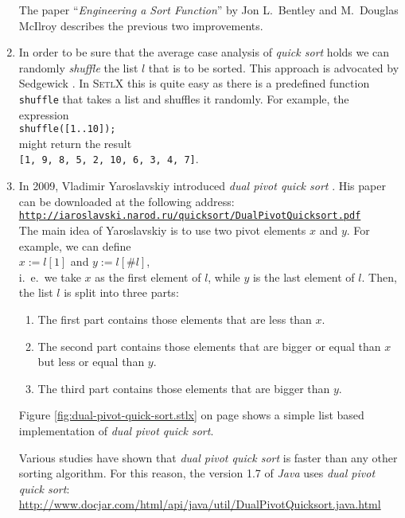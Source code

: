 \begin{enumerate}
      The paper ``\emph{Engineering a Sort Function}'' by Jon L.~Bentley and M.~Douglas McIlroy
      \cite{bentley:93} describes the previous two improvements.
\item In order to be sure that the average case analysis of \emph{quick sort} holds we can randomly
      \emph{shuffle} the list $l$ that is to be sorted.  This approach is advocated by Sedgewick
      \cite{sedgewick:2011}.  In \textsc{SetlX} this is quite easy as
      there is a predefined function \texttt{shuffle} that takes a list and shuffles it randomly.
      For example, the expression
      \\[0.2cm]
      \hspace*{1.3cm}
      \texttt{shuffle([1..10]);}
      \\[0.2cm]
      might return the result
      \\[0.2cm]
      \hspace*{1.3cm}
      \texttt{[1, 9, 8, 5, 2, 10, 6, 3, 4, 7]}.
\item In 2009, Vladimir Yaroslavskiy introduced \emph{dual pivot quick sort} \cite{yaroslavskiy:2009}.  His paper can be
      downloaded at the following address:
      \\[0.2cm]
      \hspace*{0.3cm}
      \href{http://iaroslavski.narod.ru/quicksort/DualPivotQuicksort.pdf}{\texttt{http://iaroslavski.narod.ru/quicksort/DualPivotQuicksort.pdf}}
      \\[0.2cm]
      The main idea of Yaroslavskiy is to use two pivot elements $x$ and $y$.  For example, we can
      define
      \\[0.2cm]
      \hspace*{1.3cm}
      $x := l[1]$ \quad and \quad $y := l[\#l]$,
      \\[0.2cm]
      i.~e.~we take $x$ as the first element of $l$, while $y$ is the last element of $l$.  Then, the list
      $l$ is split into three parts:
      \begin{enumerate}
      \item The first part contains those elements that are less than $x$.
      \item The second part contains those elements that are bigger or equal than $x$ but less or
            equal than $y$.
      \item The third part contains those elements that are bigger than $y$.
      \end{enumerate}
      Figure \ref{fig:dual-pivot-quick-sort.stlx} on page \pageref{fig:dual-pivot-quick-sort.stlx}
      shows a simple list based implementation of \emph{dual pivot quick sort}.



      Various studies have shown that \emph{dual pivot quick sort} is faster than any other sorting
      algorithm.  For this reason, the version 1.7 of \textsl{Java} uses \emph{dual pivot quick sort}:
      \\[0.2cm]
      \hspace*{0.3cm}
      \href{http://www.docjar.com/html/api/java/util/DualPivotQuicksort.java.html}{http://www.docjar.com/html/api/java/util/DualPivotQuicksort.java.html} 
\end{enumerate}

